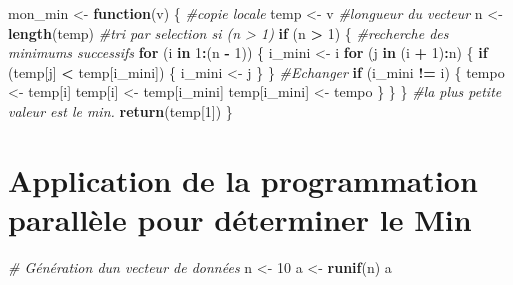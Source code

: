 \documentclass[
]{article}
\newenvironment{Shaded}{\begin{snugshade}}{\end{snugshade}}
\newcommand{\CommentTok}[1]{\textcolor[rgb]{0.56,0.35,0.01}{\textit{#1}}}
\newcommand{\ControlFlowTok}[1]{\textcolor[rgb]{0.13,0.29,0.53}{\textbf{#1}}}
\newcommand{\DecValTok}[1]{\textcolor[rgb]{0.00,0.00,0.81}{#1}}
\newcommand{\FunctionTok}[1]{\textcolor[rgb]{0.13,0.29,0.53}{\textbf{#1}}}
\newcommand{\NormalTok}[1]{#1}
\newcommand{\OtherTok}[1]{\textcolor[rgb]{0.56,0.35,0.01}{#1}}
\newcommand{\SpecialCharTok}[1]{\textcolor[rgb]{0.81,0.36,0.00}{\textbf{#1}}}
\begin{document}
\begin{Shaded}
\begin{Highlighting}[]
\NormalTok{mon\_min }\OtherTok{\textless{}{-}} \ControlFlowTok{function}\NormalTok{(v) \{}
  \CommentTok{\#copie locale}
\NormalTok{  temp }\OtherTok{\textless{}{-}}\NormalTok{ v}
  \CommentTok{\#longueur du vecteur}
\NormalTok{  n }\OtherTok{\textless{}{-}} \FunctionTok{length}\NormalTok{(temp)}
  \CommentTok{\#tri par selection si (n \textgreater{} 1)}
  \ControlFlowTok{if}\NormalTok{ (n }\SpecialCharTok{\textgreater{}} \DecValTok{1}\NormalTok{) \{}
    \CommentTok{\#recherche des minimums successifs}
    \ControlFlowTok{for}\NormalTok{ (i }\ControlFlowTok{in} \DecValTok{1}\SpecialCharTok{:}\NormalTok{(n }\SpecialCharTok{{-}} \DecValTok{1}\NormalTok{)) \{}
\NormalTok{      i\_mini }\OtherTok{\textless{}{-}}\NormalTok{ i}
      \ControlFlowTok{for}\NormalTok{ (j }\ControlFlowTok{in}\NormalTok{ (i }\SpecialCharTok{+} \DecValTok{1}\NormalTok{)}\SpecialCharTok{:}\NormalTok{n) \{}
        \ControlFlowTok{if}\NormalTok{ (temp[j] }\SpecialCharTok{\textless{}}\NormalTok{ temp[i\_mini]) \{}
\NormalTok{          i\_mini }\OtherTok{\textless{}{-}}\NormalTok{ j}
\NormalTok{        \}}
\NormalTok{      \}}
      \CommentTok{\#Echanger}
      \ControlFlowTok{if}\NormalTok{ (i\_mini }\SpecialCharTok{!=}\NormalTok{ i) \{}
\NormalTok{        tempo }\OtherTok{\textless{}{-}}\NormalTok{ temp[i]}
\NormalTok{        temp[i] }\OtherTok{\textless{}{-}}\NormalTok{ temp[i\_mini]}
\NormalTok{        temp[i\_mini] }\OtherTok{\textless{}{-}}\NormalTok{ tempo}
\NormalTok{      \}}
\NormalTok{    \}}
\NormalTok{  \}}
  \CommentTok{\#la plus petite valeur est le min.}
  \FunctionTok{return}\NormalTok{(temp[}\DecValTok{1}\NormalTok{])}
\NormalTok{\}}
\end{Highlighting}
\end{Shaded}

\hypertarget{application-de-la-programmation-paralluxe8le-pour-duxe9terminer-le-min}{%
\section{Application de la programmation parallèle pour déterminer le
Min}\label{application-de-la-programmation-paralluxe8le-pour-duxe9terminer-le-min}}

\begin{Shaded}
\begin{Highlighting}[]
\CommentTok{\# Génération d\textquotesingle{}un vecteur de données}
\NormalTok{n }\OtherTok{\textless{}{-}} \DecValTok{10}
\NormalTok{a }\OtherTok{\textless{}{-}} \FunctionTok{runif}\NormalTok{(n)}
\NormalTok{a}
\end{Highlighting}
\end{Shaded}
\end{document}
